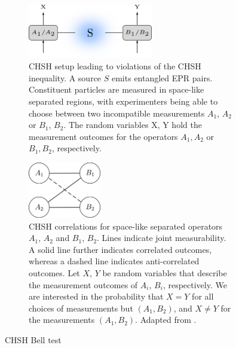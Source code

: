 \begin{figure}
\centering
\begin{subfigure}{\textwidth}
\centering
\includegraphics[width=0.60\textwidth]{images/bell.png}
\caption{CHSH setup leading to violations of the CHSH inequality. A source $S$ emits entangled EPR pairs. Constituent particles are measured in space-like separated regions, with experimenters being able to choose between two incompatible measurements $A_1$, $A_2$ or $B_1$, $B_2$. The random variables X, Y hold the measurement outcomes for the operators $A_1, A_2$ or $B_1, B_2$, respectively.\\[1em]}
\label{fig:bell}
\end{subfigure}
\begin{subfigure}{\textwidth}
\centering
\includegraphics[width=0.35\textwidth]{images/chsh.png}
\caption{CHSH correlations for space-like separated operators $A_1$, $A_2$ and $B_1$, $B_2$. Lines indicate joint measurability. A solid line further indicates correlated outcomes, whereas a dashed line indicates anti-correlated outcomes. Let $X$, $Y$ be random variables that describe the measurement outcomes of $A_i$, $B_i$, respectively. We are interested in the probability that $X=Y$ for all choices of measurements but $(A_1,B_2)$, and $X\neq Y$ for the measurements $(A_1,B_2)$. Adapted from \cite{Spekkens2012}.\\[1em]}
\label{fig:chsh}
\end{subfigure}
\caption{CHSH Bell test}
\label{fig:chshbelltest}
\end{figure}

